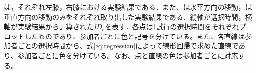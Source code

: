 \documentclass[submit, techrep]{ipsj}
\begin{document}
は，それぞれ左膝，右膝における実験結果である．また、は水平方向の移動，は垂直方向の移動のみをそれぞれ取り出した実験結果である．縦軸が選択時間，横軸が実験結果から計算された$ID_e$を表す．各点は1試行の選択時間をそれぞれプロットしたものであり、参加者ごとに色と記号を分けている。また、各直線は参加者ごとの選択時間から、式\ref{eq:regression}によって線形回帰で求めた直線であり、参加者ごとに色を分けている。なお、点と直線の色は参加者ごとに対応する。

\end{document}

